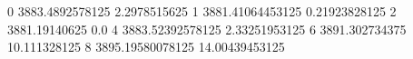 0 3883.4892578125 2.2978515625
1 3881.41064453125 0.21923828125
2 3881.19140625 0.0
4 3883.52392578125 2.33251953125
6 3891.302734375 10.111328125
8 3895.19580078125 14.00439453125
